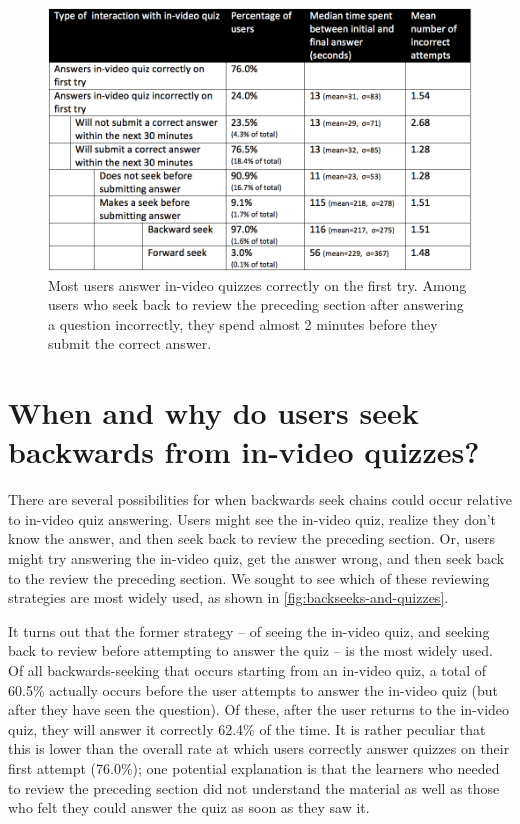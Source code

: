 \documentclass{sigchi}
\begin{document}
\begin{figure}
\includegraphics[width=1.0\columnwidth]{time-spent-on-quizzes}
\caption{Most users answer in-video quizzes correctly on the first try. Among users who seek back to review the preceding section after answering a question incorrectly, they spend almost 2 minutes before they submit the correct answer.}
\label{fig:time-spent-on-quizzes}
\end{figure}



\section{When and why do users seek backwards from in-video quizzes?}

There are several possibilities for when backwards seek chains could occur relative to in-video quiz answering. Users might see the in-video quiz, realize they don't know the answer, and then seek back to review the preceding section. Or, users might try answering the in-video quiz, get the answer wrong, and then seek back to the review the preceding section. We sought to see which of these reviewing strategies are most widely used, as shown in \autoref{fig:backseeks-and-quizzes}.

It turns out that the former strategy -- of seeing the in-video quiz, and seeking back to review before attempting to answer the quiz -- is the most widely used. Of all backwards-seeking that occurs starting from an in-video quiz, a total of 60.5\% actually occurs before the user attempts to answer the in-video quiz (but after they have seen the question). Of these, after the user returns to the in-video quiz, they will answer it correctly 62.4\% of the time. It is rather peculiar that this is lower than the overall rate at which users correctly answer quizzes on their first attempt (76.0\%); one potential explanation is that the learners who needed to review the preceding section did not understand the material as well as those who felt they could answer the quiz as soon as they saw it.
\end{document}
